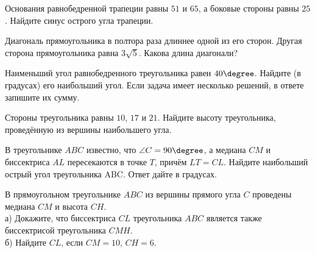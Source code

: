 %
%
\begin{homework}[number=2]
	\begin{listofex}
		\item Основания равнобедренной трапеции равны \( 51 \) и \( 65 \), а боковые стороны равны \( 25 \). Найдите синус острого угла трапеции.
		\item Диагональ прямоугольника в полтора раза длиннее одной из его сторон. Другая сторона прямоугольника равна \( 3\sqrt{5} \). Какова длина диагонали?
		\item Наименьший угол равнобедренного треугольника равен \( 40\degree \). Найдите (в градусах) его наибольший угол. Если задача
		имеет несколько решений, в ответе запишите их сумму.
		\item Стороны треугольника равны \( 10 \), \( 17 \) и \( 21 \). Найдите высоту треугольника, проведённую из вершины наибольшего угла.
		\item В треугольнике \( ABC \) известно, что \( \angle C = 90\degree \),
		а медиана \( CM \) и биссектриса \( AL \) пересекаются в точке \( T \), причём \( LT = CL \).
		Найдите наибольший острый угол треугольника ABC.
		Ответ дайте в градусах.
		\item В прямоугольном треугольнике \( ABC \) из вершины прямого
		угла \( C \) проведены медиана \( CM \) и высота \( CH \).\\
		а) Докажите, что биссектриса \( CL \) треугольника \( ABC \) является
		также биссектрисой треугольника \( CMH \).\\
		б) Найдите \( CL \), если \( CM = 10 \), \( CH = 6 \).
		\item {}
		\item {}
	\end{listofex}
\end{homework}
%
